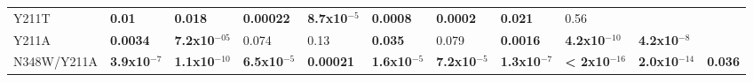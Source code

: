 \documentclass[12pt]{article}
\begin{document}
\begin {table}[H]
\begin{center}
{\begin{tabular}{l l l l l l l l l l l}
    Y211T       & \textbf{0.01}           & \textbf{0.018}          & \textbf{0.00022}        & \textbf{8.7x10$^{-5}$}  & \textbf{0.0008}         & \textbf{0.0002}           & \textbf{0.021}          & 0.56                    &                         &        \\
    Y211A       & \textbf{0.0034}         & \textbf{7.2x10$^{-05}$} & 0.074                   & 0.13                    & \textbf{0.035}          & 0.079                     & \textbf{0.0016}         & \textbf{4.2x10$^{-10}$} & \textbf{4.2x10$^{-8}$}  &        \\
    N348W/Y211A & \textbf{3.9x10$^{-7}$}  & \textbf{1.1x10$^{-10}$} & \textbf{6.5x10$^{-5}$}  & \textbf{0.00021}        & \textbf{1.6x10$^{-5}$}  & \textbf{7.2x10$^{-5}$}    & \textbf{1.3x10$^{-7}$}  & \textbf{< 2x10$^{-16}$} & \textbf{2.0x10$^{-14}$} & \textbf{0.036}  \\
    \hline
    \end{tabular}
  }
\end{center}
\end{table}
\end{document}
